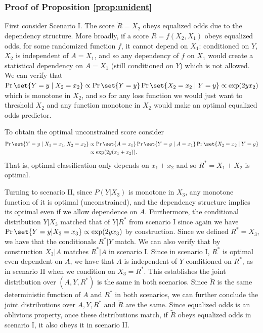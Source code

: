 \subsubsection*{Proof of Proposition \ref{prop:unident}}

  First consider Scenario I.  The score $\tilde{R}=X_2$ obeys equalized
  odds due to the dependency structure.  More broadly, if a score
  $R=f(X_2,X_1)$ obeys equalized odds, for some randomized function
  $f$, it cannot depend on $X_1$: conditioned on $Y$, $X_2$ is
  independent of $A=X_1$, and so any dependency of $f$ on $X_1$ would
  create a statistical dependency on $A=X_1$ (still conditioned on
  $Y$) which is not allowed.  We can verify that
  $\Pr\set{Y=y\mid X_2=x_2} \propto \Pr\set{Y=y}\Pr\set{X_2=x_2\mid Y=y} \propto
  \exp(2y x_2)$ which is monotone in $X_2$, and so for any loss
  function we would just want to threshold $X_2$ and any function
  monotone in $X_2$ would make an optimal equalized odds predictor.

To obtain the optimal unconstrained score consider
\begin{align*}
\Pr\set{Y=y\mid X_1=x_1,X_2=x_2} & \propto
\Pr\set{A=x_1}\Pr\set{Y=y\mid A=x_1}\Pr\set{X_2=x_2\mid Y=y} \\
&\propto\exp(2y(x_1+x_2)).
\end{align*}
That is, optimal classification only depends on
$x_1+x_2$ and so $R^*=X_1+X_2$ is optimal.

Turning to scenario II, since $P(Y|X_3)$ is monotone in $X_3$, any
monotone function of it is optimal (unconstrained), and the dependency
structure implies its optimal even if we allow dependence on $A$.
Furthermore, the conditional distribution
$Y|X_3$ matched that of  $Y|R^*$ from scenario I since again we have
$\Pr\set{Y=y|X_3=x_3}\propto \exp(2 y x_3)$ by construction.  Since we
defined $R^*=X_3$, we have that the conditionals $R^*|Y$ match.  We
can also verify that by construction $X_3|A$ matches $R^*|A$ in
scenario I.  Since in scenario I, $R^*$ is optimal even dependent on
$A$, we have that $A$ is independent of $Y$ conditioned on $R^*$, as
in scenario II when we condition on $X_3=R^*$.  This establishes the
joint distribution over $(A,Y,R^*)$ is the same in both scenarios.
Since $\tilde{R}$ is the same deterministic function of $A$ and $R^*$
in both scenarios, we can further conclude the joint distributions
over $A,Y,R^*$ and $\tilde{R}$ are the same.  Since equalized odds is
an oblivious property, once these distributions match, if $\tilde{R}$
obeys equalized odds in scenario I, it also obeys it in scenario II.
